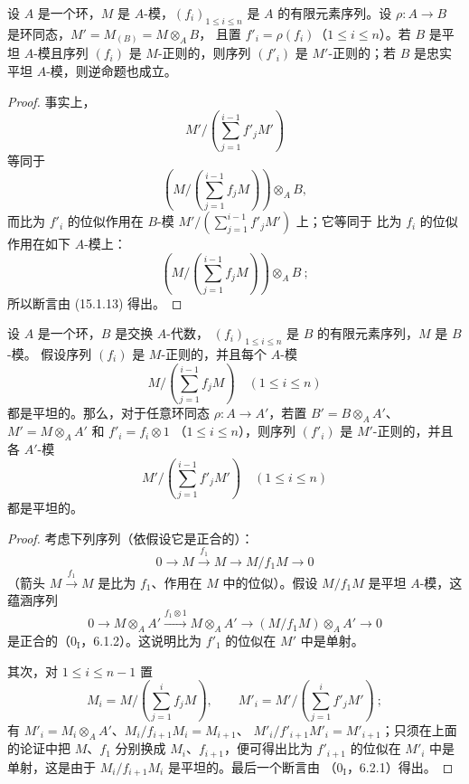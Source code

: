 \begin{corollary}[15.1.14]
\label{0.15.1.14-fr}
设 $A$ 是一个环，$M$ 是 $A$-模，$(f_i)_{1\leq i\leq n}$ 是 $A$
的有限元素序列。设 $\rho:A\to B$ 是环同态，$M'=M_{(B)}=M\otimes_A B$，
且置 $f'_i=\rho(f_i)$（$1\leq i\leq n$）。若 $B$ 是平坦 $A$-模且序列
$(f_i)$ 是 $M$-正则的，则序列 $(f'_i)$ 是 $M'$-正则的；若 $B$ 是忠实平坦
$A$-模，则逆命题也成立。
\end{corollary}

\begin{proof}
事实上，
\[
  M'/\left(\sum_{j=1}^{i-1}f'_jM'\right)
\]
等同于
\[
  \left(M/\left(\sum_{j=1}^{i-1}f_jM\right)\right)\otimes_A B,
\]
而比为 $f'_i$ 的位似作用在 $B$-模 $M'/(\sum_{j=1}^{i-1}f'_jM')$ 上；它等同于
比为 $f_i$ 的位似作用在如下 $A$-模上：
\[
  \left(M/\left(\sum_{j=1}^{i-1}f_jM\right)\right)\otimes_A B~;
\]
所以断言由 (15.1.13) 得出。
\end{proof}

\begin{proposition}[15.1.15]
\label{0.15.1.15-fr}
设 $A$ 是一个环，$B$ 是交换 $A$-代数，
$(f_i)_{1\leq i\leq n}$ 是 $B$ 的有限元素序列，$M$ 是 $B$-模。
假设序列 $(f_i)$ 是 $M$-正则的，并且每个 $A$-模
\[
  M/\left(\sum_{j=1}^{i-1}f_jM\right)\quad(1\leq i\leq n)
\]
都是平坦的。那么，对于任意环同态 $\rho:A\to A'$，若置
$B'=B\otimes_A A'$、$M'=M\otimes_A A'$ 和 $f'_i=f_i\otimes1$
（$1\leq i\leq n$），则序列 $(f'_i)$ 是 $M'$-正则的，并且各
$A'$-模
\[
  M'/\left(\sum_{j=1}^{i-1}f'_jM'\right)\quad(1\leq i\leq n)
\]
都是平坦的。
\end{proposition}

\begin{proof}
考虑下列序列（依假设它是正合的）：
\[
  0\longrightarrow M\xrightarrow{f_1}M\longrightarrow M/f_1M
  \longrightarrow0
\]
（箭头 $M\xrightarrow{f_1}M$ 是比为 $f_1$、作用在 $M$ 中的位似）。假设
$M/f_1M$ 是平坦 $A$-模，这蕴涵序列
\[
  0\longrightarrow M\otimes_A A'
  \xrightarrow{f_1\otimes1}M\otimes_A A'
  \longrightarrow(M/f_1M)\otimes_A A'\longrightarrow0
\]
是正合的（$0_{\mathrm I}$，6.1.2）。这说明比为 $f'_1$ 的位似在 $M'$ 中是单射。

其次，对 $1\leq i\leq n-1$ 置
\[
  M_i=M/\left(\sum_{j=1}^i f_jM\right),\qquad
  M'_i=M'/\left(\sum_{j=1}^i f'_jM'\right)~;
\]
有 $M'_i=M_i\otimes_A A'$、$M_i/f_{i+1}M_i=M_{i+1}$、
$M'_i/f'_{i+1}M'_i=M'_{i+1}$；只须在上面的论证中把 $M$、$f_1$
分别换成 $M_i$、$f_{i+1}$，便可得出比为 $f'_{i+1}$ 的位似在
$M'_i$ 中是单射，这是由于 $M_i/f_{i+1}M_i$ 是平坦的。最后一个断言由
（$0_{\mathrm I}$，6.2.1）得出。
\end{proof}

